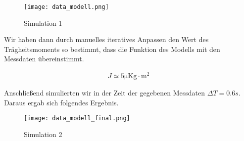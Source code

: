 \begin{figure}[H]
    \centering
    \texttt{[image: data\_modell.png]}
    \caption{Simulation 1}
    \label{fig:Simulation 1}
\end{figure}

Wir haben dann durch manuelles iteratives Anpassen den Wert des Trägheitsmoments
so bestimmt, dass die Funktion des Modells mit den Messdaten übereinstimmt. 

\begin{equation} \label{eq311}
    \begin{split}
        J \simeq 5 \mathrm{\mu Kg \cdot m^2}
    \end{split}
\end{equation}

Anschließend simulierten wir in der Zeit der gegebenen Messdaten  $\Delta T= 0.6s$.
Daraus ergab sich folgendes Ergebnis.

\begin{figure}[H]
    \centering
    \texttt{[image: data\_modell\_final.png]}
    \caption{Simulation 2}
    \label{fig:Simulation 2}
\end{figure}